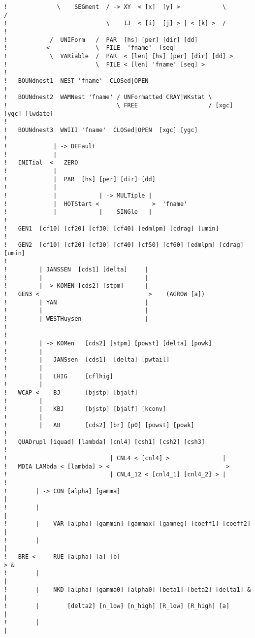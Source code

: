 \documentclass[12pt]{book}
\begin{document}
\begin{verbatim}
!              \    SEGment  / -> XY  < [x]  [y] >            \          /
!                            \    IJ  < [i]  [j] > | < [k] >  /
!
!            /  UNIForm   /  PAR  [hs] [per] [dir] [dd]
!           <             \  FILE  'fname'  [seq]
!            \  VARiable  /  PAR  < [len] [hs] [per] [dir] [dd] >
!                         \  FILE < [len] 'fname' [seq] >
!
!   BOUNdnest1  NEST 'fname'  CLOSed|OPEN
!
!   BOUNdnest2  WAMNest 'fname' / UNFormatted CRAY|WKstat \
!                               \ FREE                    / [xgc] [ygc] [lwdate]
!
!   BOUNdnest3  WWIII 'fname'  CLOSed|OPEN  [xgc] [ygc]
!
!             | -> DEFault
!             |
!   INITial  <   ZERO
!             |
!             |  PAR  [hs] [per] [dir] [dd]
!             |
!             |            | -> MULTiple |
!             |  HOTStart <               >  'fname'
!             |            |    SINGle   |
!
!   GEN1  [cf10] [cf20] [cf30] [cf40] [edmlpm] [cdrag] [umin]
!
!   GEN2  [cf10] [cf20] [cf30] [cf40] [cf50] [cf60] [edmlpm] [cdrag] [umin]
!
!         | JANSSEN  [cds1] [delta]     |
!         |                             |
!         | -> KOMEN [cds2] [stpm]      |
!   GEN3 <                               >    (AGROW [a])
!         | YAN                         |
!         |                             |
!         | WESTHuysen                  |
!
!
!         | -> KOMen   [cds2] [stpm] [powst] [delta] [powk]
!         |
!         |   JANSsen  [cds1]  [delta] [pwtail]
!         |
!         |   LHIG     [cflhig]
!         |
!   WCAP <    BJ       [bjstp] [bjalf]
!         |
!         |   KBJ      [bjstp] [bjalf] [kconv]
!         |
!         |   AB       [cds2] [br] [p0] [powst] [powk]
!
!   QUADrupl [iquad] [lambda] [cnl4] [csh1] [csh2] [csh3]
!
!                             | CNL4 < [cnl4] >               |
!   MDIA LAMbda < [lambda] > <                                 >
!                             | CNL4_12 < [cnl4_1] [cnl4_2] > |
!
!        | -> CON [alpha] [gamma]                                      |
!        |                                                             |
!        |    VAR [alpha] [gammin] [gammax] [gamneg] [coeff1] [coeff2] |
!        |                                                             |
!   BRE <     RUE [alpha] [a] [b]                                       > &
!        |                                                             |
!        |    NKD [alpha] [gamma0] [alpha0] [beta1] [beta2] [delta1] & |
!        |        [delta2] [n_low] [n_high] [R_low] [R_high] [a]       |
!        |                                                             |

\end{verbatim}
\end{document}
